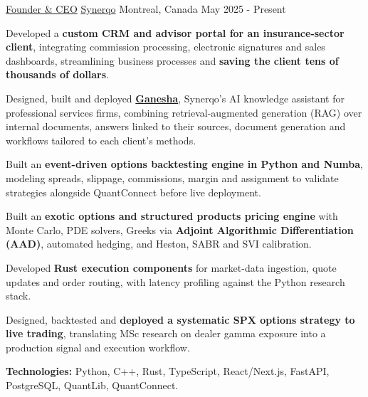\begin{cventries}

  \cventry
    {\href{https://synerqo.com/}{Founder \& CEO}}
    {\href{https://synerqo.com/}{Synerqo}}
    {Montreal, Canada}
    {May 2025 - Present}
    {
      \begin{cvitems}
        \item{Developed a \textbf{custom CRM and advisor portal for an insurance-sector client}, integrating commission processing, electronic signatures and sales dashboards, streamlining business processes and \textbf{saving the client tens of thousands of dollars}.}
        \item{Designed, built and deployed \textbf{\href{https://ganesha.synerqo.com}{Ganesha}}, Synerqo's AI knowledge assistant for professional services firms, combining retrieval-augmented generation (RAG) over internal documents, answers linked to their sources, document generation and workflows tailored to each client's methods.}
        \item{Built an \textbf{event-driven options backtesting engine in Python and Numba}, modeling spreads, slippage, commissions, margin and assignment to validate strategies alongside QuantConnect before live deployment.}
        \item{Built an \textbf{exotic options and structured products pricing engine} with Monte Carlo, PDE solvers, Greeks via \textbf{Adjoint Algorithmic Differentiation (AAD)}, automated hedging, and Heston, SABR and SVI calibration.}
        \item{Developed \textbf{Rust execution components} for market-data ingestion, quote updates and order routing, with latency profiling against the Python research stack.}
        \item{Designed, backtested and \textbf{deployed a systematic SPX options strategy to live trading}, translating MSc research on dealer gamma exposure into a production signal and execution workflow.}
        \item{\textbf{Technologies:} Python, C++, Rust, TypeScript, React/Next.js, FastAPI, PostgreSQL, QuantLib, QuantConnect.}
      \end{cvitems}
    }


\end{cventries}
